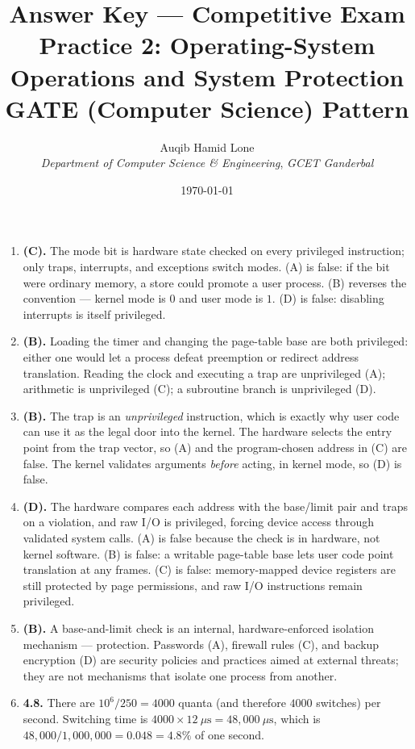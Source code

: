\documentclass[11pt]{article}
\title{Answer Key --- Competitive Exam Practice 2: Operating-System Operations and System Protection\\\large GATE (Computer Science) Pattern}
\author{Auqib Hamid Lone\\[0.3em]
  \emph{Department of Computer Science \& Engineering}, \emph{GCET Ganderbal}}
\date{\today}
\begin{document}
\maketitle

\begin{enumerate}

\item[\textbf{Q1}] \textbf{(C).} The mode bit is hardware state checked on every privileged instruction; only traps, interrupts, and exceptions switch modes. (A) is false: if the bit were ordinary memory, a store could promote a user process. (B) reverses the convention --- kernel mode is $0$ and user mode is $1$. (D) is false: disabling interrupts is itself privileged.

\item[\textbf{Q2}] \textbf{(B).} Loading the timer and changing the page-table base are both privileged: either one would let a process defeat preemption or redirect address translation. Reading the clock and executing a trap are unprivileged (A); arithmetic is unprivileged (C); a subroutine branch is unprivileged (D).

\item[\textbf{Q3}] \textbf{(B).} The trap is an \emph{unprivileged} instruction, which is exactly why user code can use it as the legal door into the kernel. The hardware selects the entry point from the trap vector, so (A) and the program-chosen address in (C) are false. The kernel validates arguments \emph{before} acting, in kernel mode, so (D) is false.

\item[\textbf{Q4}] \textbf{(D).} The hardware compares each address with the base/limit pair and traps on a violation, and raw I/O is privileged, forcing device access through validated system calls. (A) is false because the check is in hardware, not kernel software. (B) is false: a writable page-table base lets user code point translation at any frames. (C) is false: memory-mapped device registers are still protected by page permissions, and raw I/O instructions remain privileged.

\item[\textbf{Q5}] \textbf{(B).} A base-and-limit check is an internal, hardware-enforced isolation mechanism --- protection. Passwords (A), firewall rules (C), and backup encryption (D) are security policies and practices aimed at external threats; they are not mechanisms that isolate one process from another.

\item[\textbf{Q6}] \textbf{4.8.} There are $10^6/250 = 4000$ quanta (and therefore $4000$ switches) per second. Switching time is $4000 \times 12\ \mu\text{s} = 48{,}000\ \mu\text{s}$, which is $48{,}000/1{,}000{,}000 = 0.048 = 4.8\%$ of one second.


\end{enumerate}
\end{document}
